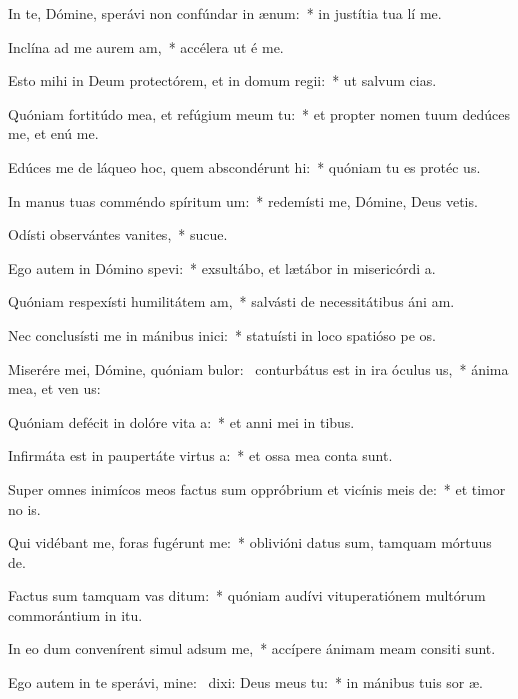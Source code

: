 \item In te, Dómine, sperávi non confúndar in ænum:~* in justítia tua lí me.
\item Inclína ad me aurem am,~* accélera ut é me.
\item Esto mihi in Deum protectórem, et in domum regii:~* ut salvum  cias.
\item Quóniam fortitúdo mea, et refúgium meum  tu:~* et propter nomen tuum dedúces me, et enú me.
\item Edúces me de láqueo hoc, quem abscondérunt hi:~* quóniam tu es protéc us.
\item In manus tuas comméndo spíritum um:~* redemísti me, Dómine, Deus vetis.
\item Odísti observántes vanites,~* sucue.
\item Ego autem in Dómino spevi:~* exsultábo, et lætábor in misericórdi a.
\item Quóniam respexísti humilitátem am,~* salvásti de necessitátibus áni am.
\item Nec conclusísti me in mánibus inici:~* statuísti in loco spatióso pe os.
\item Miserére mei, Dómine, quóniam bulor:~\pscross{} conturbátus est in ira óculus us,~* ánima mea, et ven us:
\item Quóniam defécit in dolóre vita a:~* et anni mei in tibus.
\item Infirmáta est in paupertáte virtus a:~* et ossa mea conta sunt.
\item Super omnes inimícos meos factus sum oppróbrium et vicínis meis de:~* et timor no is.
\item Qui vidébant me, foras fugérunt  me:~* oblivióni datus sum, tamquam mórtuus  de.
\item Factus sum tamquam vas ditum:~* quóniam audívi vituperatiónem multórum commorántium in itu.
\item In eo dum convenírent simul adsum me,~* accípere ánimam meam consiti sunt.
\item Ego autem in te sperávi, mine:~\pscross{} dixi: Deus meus  tu:~* in mánibus tuis sor æ.
